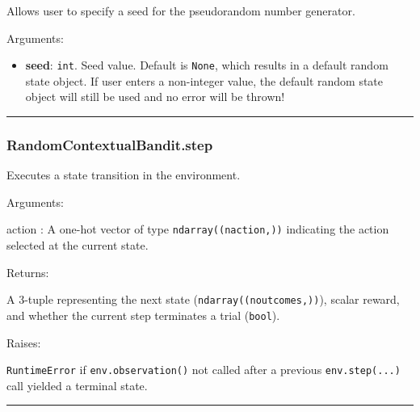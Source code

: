 Allows user to specify a seed for the pseudorandom number generator.

Arguments:

\begin{itemize}
\tightlist
\item
  \textbf{seed}: \texttt{int}. Seed value. Default is \texttt{None},
  which results in a default random state object. If user enters a
  non-integer value, the default random state object will still be used
  and no error will be thrown!
\end{itemize}

\begin{center}\rule{0.5\linewidth}{\linethickness}\end{center}

\subsubsection{RandomContextualBandit.step}\label{randomcontextualbandit.step}

\begin{Shaded}
\begin{Highlighting}[]
\end{Highlighting}
\end{Shaded}

Executes a state transition in the environment.

Arguments:

action : A one-hot vector of type \texttt{ndarray((naction,))}
indicating the action selected at the current state.

Returns:

A 3-tuple representing the next state (\texttt{ndarray((noutcomes,))}),
scalar reward, and whether the current step terminates a trial
(\texttt{bool}).

Raises:

\texttt{RuntimeError} if \texttt{env.observation()} not called after a
previous \texttt{env.step(...)} call yielded a terminal state.

\begin{center}\rule{0.5\linewidth}{\linethickness}\end{center}
